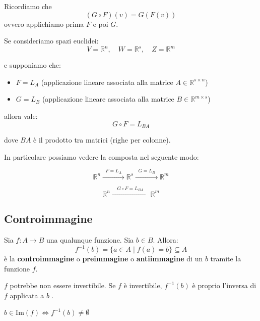\documentclass[
  a4paper,
]{article}
\providecommand{\tightlist}{%
  \setlength{\itemsep}{0pt}\setlength{\parskip}{0pt}}
\providecommand{\tightlist}{}
\begin{document}
Ricordiamo che \[
(G \circ F)(v) = G(F(v))
\] ovvero applichiamo prima \(F\) e poi \(G\).

\begin{propositionbox}
Se consideriamo spazi euclidei: \[
V = \mathbb{R}^n, \quad W = \mathbb{R}^s, \quad Z = \mathbb{R}^m
\]

e supponiamo che:

\begin{itemize}
\tightlist
\item
  \(F = L_A\) (applicazione lineare associata alla matrice
  \(A \in \mathbb{R}^{s \times n}\))
\item
  \(G = L_B\) (applicazione lineare associata alla matrice
  \(B \in \mathbb{R}^{m \times s}\))
\end{itemize}

allora vale: \[
G \circ F = L_{BA}
\]

dove \(BA\) è il prodotto tra matrici (righe per colonne).
\end{propositionbox}

\begin{observationbox}
In particolare possiamo vedere la composta nel seguente modo:

\[
\mathbb{R}^n \xrightarrow{\;\;F = L_A\;\;} \mathbb{R}^s \xrightarrow{\;\;G = L_B\;\;} \mathbb{R}^m
\]

\[
\mathbb{R}^n \xrightarrow{\quad G \circ F = L_{BA} \quad} \mathbb{R}^m
\]
\end{observationbox}

\hypertarget{controimmagine}{%
\subsection{Controimmagine}\label{controimmagine}}

\begin{definitionbox}
Sia \(f: A \to B\) una qualunque funzione. Sia \(b \in B\). Allora: \[
f^{-1}(b) = \{a \in A \mid f(a) = b\} \subseteq A
\] è la \textbf{controimmagine} o \textbf{preimmagine} o
\textbf{antiimmagine} di un \(b\) tramite la funzione \(f\).
\end{definitionbox}

\begin{notebox}
\(f\) potrebbe non essere invertibile. Se \(f\) è invertibile,
\(f^{-1}(b)\) è proprio l'inversa di \(f\) applicata a \(b\) .
\end{notebox}

\begin{notebox}
\(b \in \text{Im}(f) \iff f^{-1}(b) \not = \emptyset\)
\end{notebox}
\end{document}
